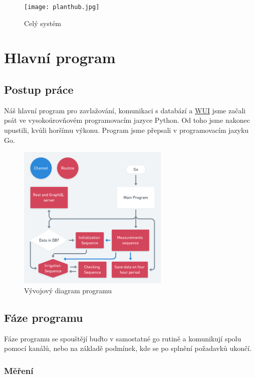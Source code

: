 \documentclass[czech,12pt,a4paper]{article}
\begin{document}
\begin{figure}[h]
	\centering
	\texttt{[image: planthub.jpg]}
	\caption{Celý systém}
\end{figure}

\clearpage

\section{Hlavní program} \label{secProgram}

\subsection{Postup práce}

Náš hlavní program pro zavlažování, komunikaci s databází a \underline{\ac{WUI}} jsme začali psát ve vysokoúrovňovém programovacím jazyce Python. Od toho jsme nakonec upustili, kvůli horšímu výkonu. Program jsme přepsali v programovacím jazyku Go.

\begin{figure}[h]
	\centering
	\includegraphics[width=0.72\linewidth]{go.png}
	\caption{Vývojový diagram programu}
\end{figure}

\subsection{Fáze programu}

Fáze programu se spouštějí buďto v samostatné go rutině a komunikují spolu pomocí kanálů, nebo na základě podmínek, kde se po splnění požadavků ukončí.

\subsubsection{Měření}
\end{document}
